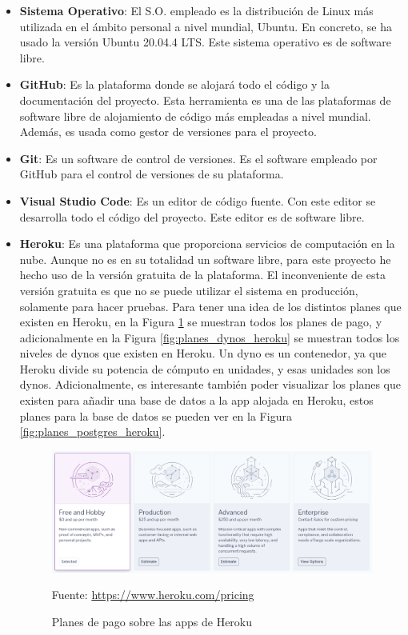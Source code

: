 \begin{itemize}
\item \textbf{Sistema Operativo}: El S.O. empleado es la distribución de Linux más utilizada en el ámbito personal a nivel mundial, Ubuntu. En concreto, se ha usado la versión Ubuntu 20.04.4 LTS. Este sistema operativo es de software libre.
\item \textbf{GitHub}: Es la plataforma donde se alojará todo el código y la documentación del proyecto. Esta herramienta es una de las plataformas de software libre de alojamiento de código más empleadas a nivel mundial. Además, es usada como gestor de versiones para el proyecto.
\item \textbf{Git}: Es un software de control de versiones. Es el software empleado por GitHub para el control de versiones de su plataforma.
\item \textbf{Visual Studio Code}: Es un editor de código fuente. Con este editor se desarrolla todo el código del proyecto. Este editor es de software libre.
\item \textbf{Heroku}: Es una plataforma que proporciona servicios de computación en la nube. Aunque no es en su totalidad un software libre, para este proyecto he hecho uso de la versión gratuita de la plataforma. El inconveniente de esta versión gratuita es que no se puede utilizar el sistema en producción, solamente para hacer pruebas. Para tener una idea de los distintos planes que existen en Heroku, en la Figura \ref{fig:planes_app_heroku} se muestran todos los planes de pago, y adicionalmente en la Figura \ref{fig:planes_dynos_heroku} se muestran todos los niveles de dynos que existen en Heroku. Un dyno es un contenedor, ya que Heroku divide su potencia de cómputo en unidades, y esas unidades son los dynos. Adicionalmente, es interesante también poder visualizar los planes que existen para añadir una base de datos a la app alojada en Heroku, estos planes para la base de datos se pueden ver en la Figura \ref{fig:planes_postgres_heroku}.

\begin{figure}[H]
\centering
\includegraphics[width=1.0\textwidth]{imagenes/05_Gestion/planes_heroku.png}
\begin{center}
Fuente: \url{https://www.heroku.com/pricing}
\end{center}
\caption{Planes de pago sobre las apps de Heroku}
\label{fig:planes_app_heroku}
\end{figure}


\end{itemize}
